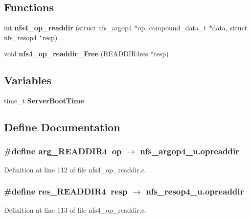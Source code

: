 \subsection*{Functions}
\begin{CompactItemize}
\item 
int {\bf nfs4\_\-op\_\-readdir} (struct nfs\_\-argop4 $\ast$op, compound\_\-data\_\-t $\ast$data, struct nfs\_\-resop4 $\ast$resp)
\item 
void {\bf nfs4\_\-op\_\-readdir\_\-Free} (READDIR4res $\ast$resp)
\end{CompactItemize}
\subsection*{Variables}
\begin{CompactItemize}
\item 
time\_\-t {\bf ServerBootTime}
\end{CompactItemize}


\subsection{Define Documentation}
\subsubsection[{arg\_\-READDIR4}]{\setlength{\rightskip}{0pt plus 5cm}\#define arg\_\-READDIR4~op $\rightarrow$ nfs\_\-argop4\_\-u.opreaddir}\label{nfs4__op__readdir_8c_9d7f38a94db656e965133d2775db49cd}




Definition at line 112 of file nfs4\_\-op\_\-readdir.c.
\subsubsection[{res\_\-READDIR4}]{\setlength{\rightskip}{0pt plus 5cm}\#define res\_\-READDIR4~resp $\rightarrow$ nfs\_\-resop4\_\-u.opreaddir}\label{nfs4__op__readdir_8c_4431793853d48901cff825fcd7b56869}




Definition at line 113 of file nfs4\_\-op\_\-readdir.c.

